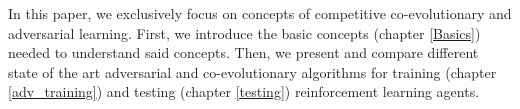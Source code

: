 In this paper, we exclusively focus on concepts of competitive co-evolutionary and adversarial learning. First, we introduce the basic concepts (chapter \ref{Basics}) needed to understand said concepts. Then, we present and compare different state of the art adversarial and co-evolutionary algorithms for training (chapter \ref{adv_training}) and testing (chapter \ref{testing}) reinforcement learning agents.